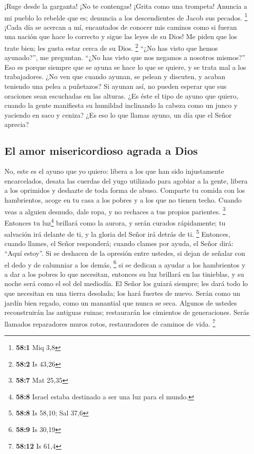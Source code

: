  ¡Ruge desde la garganta! ¡No te contengas! ¡Grita como
una trompeta! Anuncia a mi pueblo lo rebelde que es; denuncia a los
descendientes de Jacob sus pecados. \footnote{\textbf{58:1} Miq 3,8}
 ¡Cada día se acercan a mí, encantados de conocer mis
caminos como si fueran una nación que hace lo correcto y sigue las leyes
de su Dios! Me piden que los trate bien; les gusta estar cerca de su
Dios. \footnote{\textbf{58:2} Is 43,26}  ``¿No has visto
que hemos ayunado?'', me preguntan. ``¿No has visto que nos negamos a
nosotros mismos?'' Eso es porque siempre que se ayuna se hace lo que se
quiere, y se trata mal a los trabajadores.  ¿No ven que
cuando ayunan, se pelean y discuten, y acaban teniendo una pelea a
puñetazos? Si ayunan así, no pueden esperar que sus oraciones sean
escuchadas en las alturas.  ¿Es éste el tipo de ayuno que
quiero, cuando la gente manifiesta su humildad inclinando la cabeza como
un junco y yaciendo en saco y ceniza? ¿Es eso lo que llamas ayuno, un
día que el Señor aprecia?

\hypertarget{el-amor-misericordioso-agrada-a-dios}{%
\subsection{El amor misericordioso agrada a
Dios}\label{el-amor-misericordioso-agrada-a-dios}}

 No, este es el ayuno que yo quiero: libera a los que han
sido injustamente encarcelados, desata las cuerdas del yugo utilizado
para agobiar a la gente, libera a los oprimidos y deshazte de toda forma
de abuso.  Comparte tu comida con los hambrientos, acoge
en tu casa a los pobres y a los que no tienen techo. Cuando veas a
alguien desnudo, dale ropa, y no rechaces a tus propios parientes.
\footnote{\textbf{58:7} Mat 25,35}  Entonces tu
luz\footnote{\textbf{58:8} Israel estaba destinado a ser una luz para el
  mundo.} brillará como la aurora, y serán curados rápidamente; tu
salvación irá delante de ti, y la gloria del Señor irá detrás de ti.
\footnote{\textbf{58:8} Is 58,10; Sal 37,6}  Entonces,
cuando llames, el Señor responderá; cuando clames por ayuda, el Señor
dirá: ``Aquí estoy''. Si se deshacen de la opresión entre ustedes, si
dejan de señalar con el dedo y de calumniar a los demás, \footnote{\textbf{58:9}
  Is 30,19}  si se dedican a ayudar a los hambrientos y a
dar a los pobres lo que necesitan, entonces su luz brillará en las
tinieblas, y su noche será como el sol del mediodía.  El
Señor los guiará siempre; les dará todo lo que necesitan en una tierra
desolada; los hará fuertes de nuevo. Serán como un jardín bien regado,
como un manantial que nunca se seca.  Algunos de ustedes
reconstruirán las antiguas ruinas; restaurarán los cimientos de
generaciones. Serás llamados reparadores muros rotos, restauradores de
caminos de vida. \footnote{\textbf{58:12} Is 61,4}


